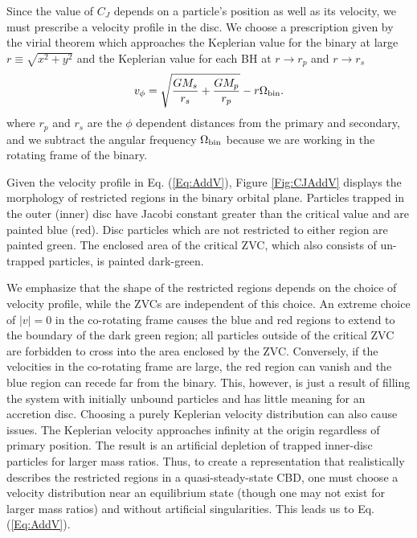 Since the value of $C_J$ depends on a particle's position as well as
its velocity, we must prescribe a velocity profile in the disc. We
choose a prescription given by the virial theorem which approaches the
Keplerian value for the binary at large $r\equiv\sqrt{x^2 + y^2}$ and
the Keplerian value for each BH at $r \rightarrow r_p$ and $r
\rightarrow r_s$
\begin{equation}
v_{\phi} =   \sqrt{\frac{GM_s}{r_s} + \frac{GM_p}{r_p}}  - r\Omega_{\rm{bin}}.
\label{Eq:AddV}
\end{equation}
where $r_p$ and $r_s$ are the $\phi$ dependent distances from the
primary and secondary, and we subtract the angular frequency
$\Omega_{\rm{bin}}$ because we are working in the rotating frame of the
binary.


Given the velocity profile in Eq. (\ref{Eq:AddV}), Figure
\ref{Fig:CJAddV} displays the morphology of restricted regions in the
binary orbital plane. Particles trapped in the outer (inner) disc have
Jacobi constant greater than the critical value and are painted blue
(red). Disc particles which are not restricted to either region are
painted green. The enclosed area of the critical ZVC, which also
consists of un-trapped particles, is painted dark-green.


We emphasize that the shape of the restricted regions depends on the
choice of velocity profile, while the ZVCs are independent of this
choice. An extreme choice of $|v|=0$ in the co-rotating frame causes
the blue and red regions to extend to the boundary of the dark green
region; all particles outside of the critical ZVC are forbidden to
cross into the area enclosed by the ZVC. Conversely, if the velocities
in the co-rotating frame are large, the red region can vanish and the
blue region can recede far from the binary. This, however, is just a
result of filling the system with initially unbound particles and has
little meaning for an accretion disc. Choosing a purely Keplerian
velocity distribution can also cause issues. The Keplerian velocity
approaches infinity at the origin regardless of primary position. The
result is an artificial depletion of trapped inner-disc particles for
larger mass ratios. Thus, to create a representation that
realistically describes the restricted regions in a quasi-steady-state
CBD, one must choose a velocity distribution near an equilibrium state
(though one may not exist for larger mass ratios) and without
artificial singularities. This leads us to Eq. (\ref{Eq:AddV}).



